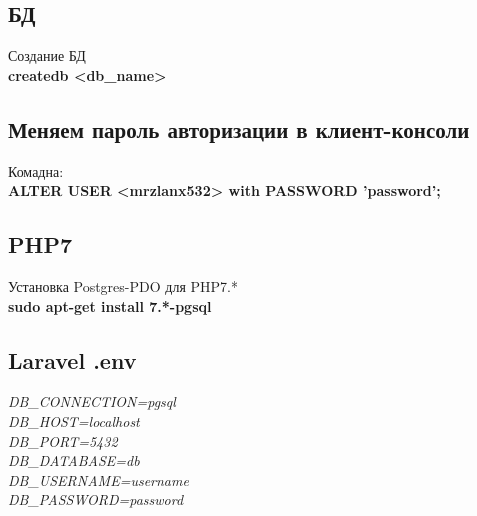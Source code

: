 \documentclass[a4paper, 12px]{article}
\begin{document}
\subsection{БД}

Создание БД\\
\textbf{createdb <db\_name>}

\subsection{Меняем пароль авторизации в клиент-консоли}
Комадна: \\
\textbf{ALTER USER <mrzlanx532> with PASSWORD 'password';}

\subsection{PHP7}

Установка Postgres-PDO для PHP7.*\\
\textbf{sudo apt-get install 7.*-pgsql}

\subsection{Laravel .env}

\textit{DB\_CONNECTION=pgsql\\
	DB\_HOST=localhost\\
	DB\_PORT=5432\\
	DB\_DATABASE=db\\
	DB\_USERNAME=username\\
	DB\_PASSWORD=password\\}
\end{document}
